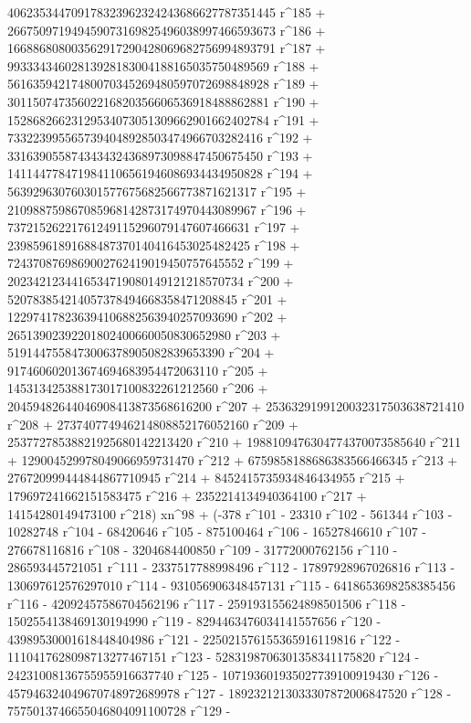        406235344709178323962324243686627787351445 r^185 + 
       266750971949459073169825496038997466593673 r^186 + 
       166886808003562917290428069682756994893791 r^187 + 
       99333434602813928183004188165035750489569 r^188 + 
       56163594217480070345269480597072698848928 r^189 + 
       30115074735602216820356606536918488862881 r^190 + 
       15286826623129534073051309662901662402784 r^191 + 
       7332239955657394048928503474966703282416 r^192 + 
       3316390558743434324368973098847450675450 r^193 + 
       1411447784719841106561946086934434950828 r^194 + 
       563929630760301577675682566773871621317 r^195 + 
       210988759867085968142873174970443089967 r^196 + 
       73721526221761249115296079147607466631 r^197 + 
       23985961891688487370140416453025482425 r^198 + 
       7243708769869002762419019450757645552 r^199 + 
       2023421234416534719080149121218570734 r^200 + 
       520783854214057378494668358471208845 r^201 + 
       122974178236394106882563940257093690 r^202 + 
       26513902392201802400660050830652980 r^203 + 
       5191447558473006378905082839653390 r^204 + 
       917460602013674694683954472063110 r^205 + 
       145313425388173017100832261212560 r^206 + 
       20459482644046908413873568616200 r^207 + 
       2536329199120032317503638721410 r^208 + 
       273740774946214808852176052160 r^209 + 
       25377278538821925680142213420 r^210 + 
       1988109476304774370073585640 r^211 + 
       129004529978049066959731470 r^212 + 
       6759858188686383566466345 r^213 + 
       276720999444844867710945 r^214 + 
       8452415735934846434955 r^215 + 179697241662151583475 r^216 + 
       2352214134940364100 r^217 + 
       14154280149473100 r^218) xn^98 + (-378 r^101 - 23310 r^102 - 
       561344 r^103 - 10282748 r^104 - 68420646 r^105 - 
       875100464 r^106 - 16527846610 r^107 - 276678116816 r^108 - 
       3204684400850 r^109 - 31772000762156 r^110 - 
       286593445721051 r^111 - 2337517788998496 r^112 - 
       17897928967026816 r^113 - 130697612576297010 r^114 - 
       931056906348457131 r^115 - 6418653698258385456 r^116 - 
       42092457586704562196 r^117 - 259193155624898501506 r^118 - 
       1502554138469130194990 r^119 - 8294463476034141557656 r^120 - 
       43989530001618448404986 r^121 - 
       225021576155365916119816 r^122 - 
       1110417628098713277467151 r^123 - 
       5283198706301358341175820 r^124 - 
       24231008136755955916637740 r^125 - 
       107193601935027739100919430 r^126 - 
       457946324049670748972689978 r^127 - 
       1892321213033307872006847520 r^128 - 
       7575013746655046804091100728 r^129 - 
